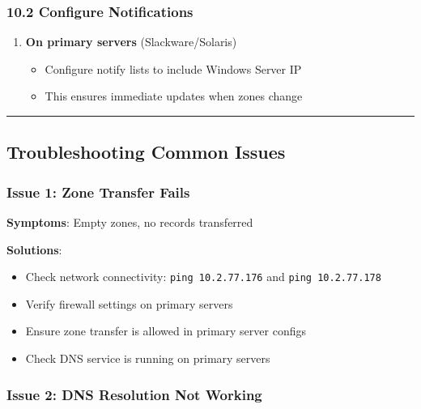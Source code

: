 \subsubsection{10.2 Configure Notifications}\label{configure-notifications}

\begin{enumerate}
\def\labelenumi{\arabic{enumi}.}
\tightlist
\item
  \textbf{On primary servers} (Slackware/Solaris)

  \begin{itemize}
  \tightlist
  \item
    Configure notify lists to include Windows Server IP
  \item
    This ensures immediate updates when zones change
  \end{itemize}
\end{enumerate}

\begin{center}\rule{0.5\linewidth}{0.5pt}\end{center}

\subsection{Troubleshooting Common Issues}\label{troubleshooting-common-issues}

\subsubsection{Issue 1: Zone Transfer Fails}\label{issue-1-zone-transfer-fails}

\textbf{Symptoms}: Empty zones, no records transferred

\textbf{Solutions}:
\begin{itemize}
\tightlist
\item
  Check network connectivity: \texttt{ping 10.2.77.176} and \texttt{ping 10.2.77.178}
\item
  Verify firewall settings on primary servers
\item
  Ensure zone transfer is allowed in primary server configs
\item
  Check DNS service is running on primary servers
\end{itemize}

\subsubsection{Issue 2: DNS Resolution Not Working}\label{issue-2-dns-resolution-not-working}

